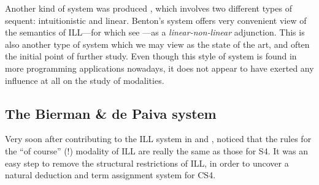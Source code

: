 \documentclass[a4paper]{amsart}
\begin{document}
Another kind of system was produced \cite{Benton1994}, which
involves two different types of sequent: intuitionistic and
linear. Benton's system offers very convenient view of the
semantics of \textsf{ILL}---for which see \cite{Mellies2009}---as a
\emph{linear-non-linear} adjunction. This is also another type of
system which we may view as the state of the art, and often the
initial point of further study. Even though this style of system
is found in more programming applications nowadays, it does not
appear to have exerted any influence at all on the study of
modalities.

\subsection{The Bierman \& de Paiva system}

Very soon after contributing to the \textsf{ILL} system in
\cite{Bierman1992} and \cite{Benton1993b}, \cite{Bierman1992a,
Bierman1996a, Bierman2000a} noticed that the rules for the ``of
course'' ($!$) modality of \textsf{ILL} are really the same as those for
\textsf{S4}. It was an easy step to remove the structural
restrictions of \textsf{ILL}, in order to uncover a natural deduction and
term assignment system for \textsf{CS4}.
\end{document}
